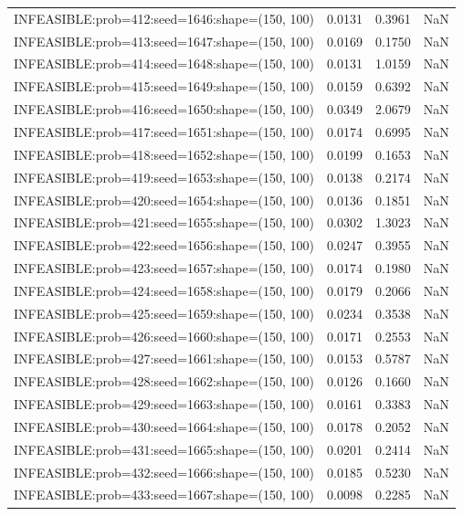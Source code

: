 \begin{longtable}{lccc}
INFEASIBLE:prob=412:seed=1646:shape=(150, 100) &   0.0131 &  0.3961 &    NaN \\
INFEASIBLE:prob=413:seed=1647:shape=(150, 100) &   0.0169 &  0.1750 &    NaN \\
INFEASIBLE:prob=414:seed=1648:shape=(150, 100) &   0.0131 &  1.0159 &    NaN \\
INFEASIBLE:prob=415:seed=1649:shape=(150, 100) &   0.0159 &  0.6392 &    NaN \\
INFEASIBLE:prob=416:seed=1650:shape=(150, 100) &   0.0349 &  2.0679 &    NaN \\
INFEASIBLE:prob=417:seed=1651:shape=(150, 100) &   0.0174 &  0.6995 &    NaN \\
INFEASIBLE:prob=418:seed=1652:shape=(150, 100) &   0.0199 &  0.1653 &    NaN \\
INFEASIBLE:prob=419:seed=1653:shape=(150, 100) &   0.0138 &  0.2174 &    NaN \\
INFEASIBLE:prob=420:seed=1654:shape=(150, 100) &   0.0136 &  0.1851 &    NaN \\
INFEASIBLE:prob=421:seed=1655:shape=(150, 100) &   0.0302 &  1.3023 &    NaN \\
INFEASIBLE:prob=422:seed=1656:shape=(150, 100) &   0.0247 &  0.3955 &    NaN \\
INFEASIBLE:prob=423:seed=1657:shape=(150, 100) &   0.0174 &  0.1980 &    NaN \\
INFEASIBLE:prob=424:seed=1658:shape=(150, 100) &   0.0179 &  0.2066 &    NaN \\
INFEASIBLE:prob=425:seed=1659:shape=(150, 100) &   0.0234 &  0.3538 &    NaN \\
INFEASIBLE:prob=426:seed=1660:shape=(150, 100) &   0.0171 &  0.2553 &    NaN \\
INFEASIBLE:prob=427:seed=1661:shape=(150, 100) &   0.0153 &  0.5787 &    NaN \\
INFEASIBLE:prob=428:seed=1662:shape=(150, 100) &   0.0126 &  0.1660 &    NaN \\
INFEASIBLE:prob=429:seed=1663:shape=(150, 100) &   0.0161 &  0.3383 &    NaN \\
INFEASIBLE:prob=430:seed=1664:shape=(150, 100) &   0.0178 &  0.2052 &    NaN \\
INFEASIBLE:prob=431:seed=1665:shape=(150, 100) &   0.0201 &  0.2414 &    NaN \\
INFEASIBLE:prob=432:seed=1666:shape=(150, 100) &   0.0185 &  0.5230 &    NaN \\
INFEASIBLE:prob=433:seed=1667:shape=(150, 100) &   0.0098 &  0.2285 &    NaN \\

\end{longtable}
